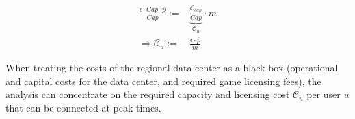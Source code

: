 \begin{align} \label{eq:computational_efficiency}
	\frac{\epsilon \cdot Cap \cdot \bar{p}}{Cap} :=& \underbrace{\frac{\mathcal{C}_{cap}}{Cap}}_{\mathcal{C}_{u}} \cdot m\\
	\Longrightarrow \mathcal{C}_{u} :=& \frac{\epsilon \cdot \bar{p}}{m}
\end{align}

When treating the costs of the regional data center as a black box (operational and capital costs for the data center, and required game licensing fees), the analysis can concentrate on the required capacity and licensing cost $\mathcal{C}_{u}$ per user $u$ that can be connected at peak times. 








